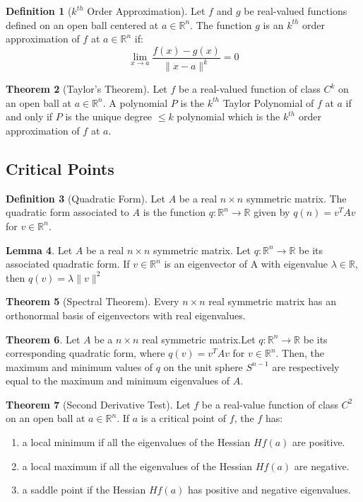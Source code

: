 \documentclass[12pt]{article}
\theoremstyle{definition}
\newtheorem{definition}{Definition}[subsection]
\newtheorem{lemma}[definition]{Lemma}
\newtheorem{theorem}[definition]{Theorem}
\theoremstyle{remark}
\begin{document}
\begin{definition}[$k^{th}$ Order Approximation]
Let $f$ and $g$ be real-valued functions defined on an open ball centered at $a\in \mathbb{R}^n.$ The function $g$ is an $k^{th}$ order approximation of $f$ at $a\in\mathbb{R}^n$ if:
\[
\lim_{x\to a}\frac{f(x)-g(x)}{\|x-a\|^k}=0
\]
\end{definition}

\begin{theorem}[Taylor's Theorem]
Let $f$ be a real-valued function of class $C^k$ on an open ball at $a\in \mathbb{R}^n.$ A polynomial $P$ is the $k^{th}$ Taylor Polynomial of $f$ at $a$ if and only if $P$ is the unique degree $\leq k$ polynomial which is the $k^{th}$ order approximation of $f$ at $a.$
\end{theorem}


\subsection{Critical Points}
\begin{definition}[Quadratic Form]
Let $A$ be a real $n\times n$ symmetric matrix. The quadratic form associated to $A$ is the function $q:\mathbb{R}^n\to\mathbb{R}$ given by $q(n)=v^TAv$ for $v\in\mathbb{R}^n.$ 
\end{definition}

\begin{lemma}
Let $A$ be a real $n\times n$ symmetric matrix. Let $q:\mathbb{R}^n\to\mathbb{R}$ be its associated quadratic form. If $v\in\mathbb{R}^n$ is an eigenvector of A with eigenvalue $\lambda\in \mathbb{R}$, then $q(v)=\lambda\|v\|^2$
\end{lemma}

\begin{theorem}[Spectral Theorem]
Every $n\times n$ real symmetric matrix has an orthonormal basis of eigenvectors with real eigenvalues.
\end{theorem}

\begin{theorem}
Let $A$ be a $n\times n$ real symmetric matrix.Let $q:\mathbb{R}^n\to\mathbb{R}$ be its corresponding quadratic form, where $q(v)=v^TAv$ for $v\in\mathbb{R}^n.$ Then, the maximum and minimum values of $q$ on the unit sphere $S^{n-1}$ are respectively equal to the maximum and minimum eigenvalues of $A.$
\end{theorem}

\begin{theorem}[Second Derivative Test]
Let $f$ be a real-value function of class $C^2$ on an open ball at $a\in\mathbb{R}^n.$ If $a$ is a critical point of $f$, the $f$ has:
\begin{enumerate}[label=(\alph*), nosep]
\item a local minimum if all the eigenvalues of the Hessian $Hf(a)$ are positive.
\item a local maximum if all the eigenvalues of the Hessian $Hf(a)$ are negative.
\item a saddle point if the Hessian $Hf(a)$ has positive and negative eigenvalues.
\end{enumerate}
\end{theorem}
\end{document}
